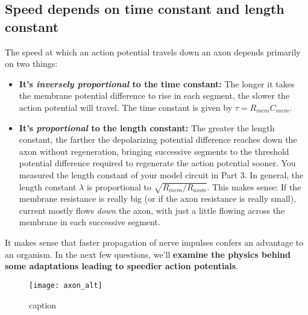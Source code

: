 \subsection*{Speed depends on time constant and length constant}
The speed at which an action potential travels down an axon depends primarily on two things:
\begin{itemize}
\itemsep-0.2em
\item \textbf{It's \emph{inversely proportional} to the time constant:} The longer it takes the membrane potential difference to rise in each segment, the slower the action potential will travel. The time constant is given by $\tau = R_{mem}C_{mem}$.
\item \textbf{It's \emph{proportional} to the length constant:} The greater the length constant, the farther the depolarizing potential difference reaches down the axon without regeneration, bringing successive segments to the threshold potential difference required to regenerate the action potential sooner. You measured the length constant of your model circuit in Part 3. In general, the length constant $\lambda$ is proportional to $\sqrt{R_{mem}/R_{axon}}$. This makes sense: If the membrane resistance is really big (or if the axon resistance is really small), current mostly flows \emph{down} the axon, with just a little flowing across the membrane in each successive segment.
\end{itemize}
It makes sense that faster propagation of nerve impulses confers an advantage to an organism.
In the next few questions, we'll \textbf{examine the physics behind some adaptations leading to speedier action potentials}.

\begin{figure}[hbtp]
	\centering
	\texttt{[image: axon\_alt]}
	\caption{caption}
	\label{fig:axon_alt}
	\vspace{-20pt}
\end{figure}


